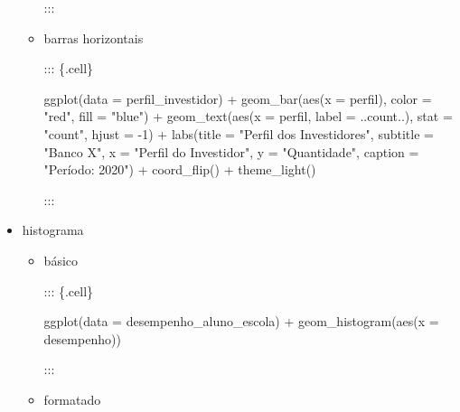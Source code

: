 \documentclass[
  letterpaper,
  DIV=11,
  numbers=noendperiod]{scrreprt}
\newenvironment{Shaded}{\begin{snugshade}}{\end{snugshade}}
\newcommand{\AttributeTok}[1]{\textcolor[rgb]{0.40,0.45,0.13}{#1}}
\newcommand{\DecValTok}[1]{\textcolor[rgb]{0.68,0.00,0.00}{#1}}
\newcommand{\FunctionTok}[1]{\textcolor[rgb]{0.28,0.35,0.67}{#1}}
\newcommand{\NormalTok}[1]{\textcolor[rgb]{0.00,0.23,0.31}{#1}}
\newcommand{\SpecialCharTok}[1]{\textcolor[rgb]{0.37,0.37,0.37}{#1}}
\newcommand{\StringTok}[1]{\textcolor[rgb]{0.13,0.47,0.30}{#1}}
\begin{document}
\begin{itemize}
\begin{itemize}
    :::
  \item
    barras horizontais

    ::: \{.cell\}

\begin{Shaded}
\begin{Highlighting}[]
    \FunctionTok{ggplot}\NormalTok{(}\AttributeTok{data =}\NormalTok{ perfil\_investidor) }\SpecialCharTok{+}
        \FunctionTok{geom\_bar}\NormalTok{(}\FunctionTok{aes}\NormalTok{(}\AttributeTok{x =}\NormalTok{ perfil), }\AttributeTok{color =} \StringTok{"red"}\NormalTok{, }\AttributeTok{fill =} \StringTok{"blue"}\NormalTok{) }\SpecialCharTok{+}
        \FunctionTok{geom\_text}\NormalTok{(}\FunctionTok{aes}\NormalTok{(}\AttributeTok{x =}\NormalTok{ perfil, }\AttributeTok{label =}\NormalTok{ ..count..), }\AttributeTok{stat =} \StringTok{"count"}\NormalTok{, }\AttributeTok{hjust =} \SpecialCharTok{{-}}\DecValTok{1}\NormalTok{) }\SpecialCharTok{+}
        \FunctionTok{labs}\NormalTok{(}\AttributeTok{title =} \StringTok{"Perfil dos Investidores"}\NormalTok{,}
            \AttributeTok{subtitle =} \StringTok{"Banco X"}\NormalTok{,}
            \AttributeTok{x =} \StringTok{"Perfil do Investidor"}\NormalTok{,}
            \AttributeTok{y =} \StringTok{"Quantidade"}\NormalTok{,}
            \AttributeTok{caption =} \StringTok{"Período: 2020"}\NormalTok{) }\SpecialCharTok{+}
        \FunctionTok{coord\_flip}\NormalTok{() }\SpecialCharTok{+}
        \FunctionTok{theme\_light}\NormalTok{()}
\end{Highlighting}
\end{Shaded}

    :::
  \end{itemize}
\item
  histograma

  \begin{itemize}
  \item
    básico

    ::: \{.cell\}

\begin{Shaded}
\begin{Highlighting}[]
    \FunctionTok{ggplot}\NormalTok{(}\AttributeTok{data =}\NormalTok{ desempenho\_aluno\_escola) }\SpecialCharTok{+}
        \FunctionTok{geom\_histogram}\NormalTok{(}\FunctionTok{aes}\NormalTok{(}\AttributeTok{x =}\NormalTok{ desempenho))}
\end{Highlighting}
\end{Shaded}

    :::
  \item
    formatado


\end{itemize}
\end{itemize}
\end{document}
